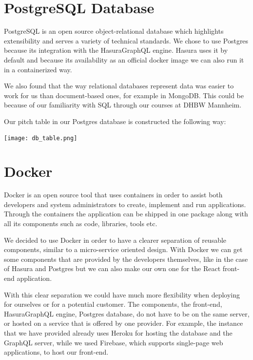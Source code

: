 \section{PostgreSQL Database}


PostgreSQL is an open source object-relational database which highlights extensibility and serves a variety of technical standards. We chose to use Postgres because its integration with the HasuraGraphQL engine. Hasura uses it by default and because its availability as an official docker image we can also run it in a containerized way.
 
We also found that the way relational databases represent data was easier to work for us than document-based ones, for example in MongoDB. This could be because of our familiarity with SQL through our courses at DHBW Mannheim.

Our pitch table in our Postgres database is constructed the following way:

\begin{center}
	\texttt{[image: db\_table.png]}
\end{center}

\section{Docker}


Docker is an open source tool that uses containers in order to assist both developers and system administrators to create, implement and run applications. Through the containers the application can be shipped in one package along with all its components such as code, libraries, tools etc.

We decided to use Docker in order to have a clearer separation of reusable components, similar to a micro-service oriented design. With Docker we can get some components that are provided by the developers themselves, like in the case of Hasura and Postgres but we can also make our own one for the React front-end application.

With this clear separation we could have much more flexibility when deploying for ourselves or for a potential customer. The components, the front-end, HasuraGraphQL engine, Postgres database, do not have to be on the same server, or hosted on a service that is offered by one provider. For example, the instance that we have provided already uses Heroku for hosting the database and the GraphQL server, while we used Firebase, which supports single-page web applications, to host our front-end.

